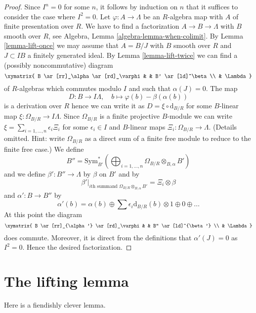 \begin{proof}
Since $I^n = 0$ for some $n$, it follows by induction on $n$ that
it suffices to consider the case where $I^2 = 0$. Let
$\varphi : A \to \Lambda$ be an $R$-algebra map with $A$ of finite
presentation over $R$. We have to find a factorization $A \to B \to \Lambda$
with $B$ smooth over $R$, see Algebra, Lemma \ref{algebra-lemma-when-colimit}.
By Lemma \ref{lemma-lift-once} we may assume that
$A = B/J$ with $B$ smooth over $R$ and $J \subset IB$
a finitely generated ideal. By
Lemma \ref{lemma-lift-twice}
we can find a (possibly noncommutative) diagram
$$
\xymatrix{
B \ar[rr]_\alpha \ar[rd]_\varphi & & B' \ar[ld]^\beta \\
& \Lambda
}
$$
of $R$-algebras which commutes modulo $I$ and such that $\alpha(J) = 0$.
The map
$$
D : B \longrightarrow I\Lambda,\quad
b \longmapsto \varphi(b) - \beta(\alpha(b))
$$
is a derivation over $R$ hence we can write it as
$D = \xi \circ \text{d}_{B/R}$ for some $B$-linear map
$\xi : \Omega_{B/R} \to I\Lambda$. Since $\Omega_{B/R}$ is a
finite projective $B$-module we can write
$\xi = \sum_{i = 1, \ldots, n} \epsilon_i \Xi_i$
for some $\epsilon_i \in I$ and $B$-linear maps
$\Xi_i : \Omega_{B/R} \to \Lambda$.
(Details omitted. Hint: write $\Omega_{B/R}$ as a direct sum of
a finite free module to reduce to the finite free case.)
We define
$$
B'' = \text{Sym}^*_{B'}\left(\bigoplus\nolimits_{i = 1, \ldots, n}
\Omega_{B/R} \otimes_{B, \alpha} B'\right)
$$
and we define $\beta' : B'' \to \Lambda$ by
$\beta$ on $B'$ and by
$$
\beta'|_{i\text{th summand }\Omega_{B/R} \otimes_{B, \alpha} B'} =
\Xi_i \otimes \beta
$$
and $\alpha' : B \to B''$ by
$$
\alpha'(b) =
\alpha(b) \oplus \sum \epsilon_i \text{d}_{B/R}(b) \otimes 1
\oplus 0 \oplus \ldots
$$
At this point the diagram
$$
\xymatrix{
B \ar[rr]_{\alpha'} \ar[rd]_\varphi & & B'' \ar[ld]^{\beta'} \\
& \Lambda
}
$$
does commute. Moreover, it is direct from the definitions that
$\alpha'(J) = 0$ as $I^2 = 0$. Hence the desired factorization.
\end{proof}






\section{The lifting lemma}
\label{section-lifting-lemma}

\noindent
Here is a fiendishly clever lemma.

